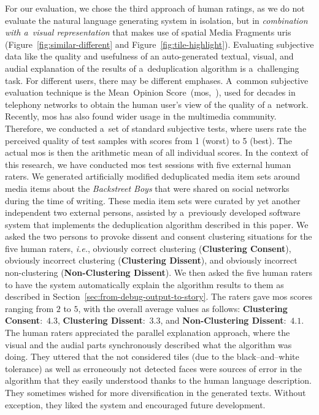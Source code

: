 \documentclass{article}
\begin{document}
For our evaluation, we chose the third approach of human ratings, as we do not evaluate the natural language generating system in isolation, but in \emph{combination with a~visual representation} that makes use of spatial Media Fragments {\sc uri}s (Figure~\ref{fig:similar-different} and Figure~\ref{fig:tile-highlight}). Evaluating subjective data like the quality and usefulness of an auto-generated textual, visual, and audial explanation of the results of a~deduplication algorithm is a~challenging task. For different users, there may be different emphases. A~common subjective evaluation technique
is the Mean~Opinion Score~({\sc mos},~\cite{itu1998mos}), used for decades in telephony networks to obtain the human user's view of the quality of a~network.
Recently, {\sc mos} has also found wider usage in the multimedia community. Therefore, we conducted a~set of standard subjective tests, where users rate the perceived quality of test samples with scores from 1 (worst) to 5 (best). The actual {\sc mos} is then the arithmetic mean of all individual scores. In the context of this research, we have conducted {\sc mos} test sessions with five external human raters. We generated artificially modified deduplicated media item sets around media items about the \emph{Backstreet Boys} that were shared on social networks during the time of writing. These media item sets were curated by yet another independent two external persons, assisted by a~previously developed software system that implements the deduplication algorithm described in this paper. We asked the two persons to provoke dissent and consent clustering situations for the five human raters, \emph{i.e.}, obviously correct clustering (\textbf{Clustering Consent}), obviously incorrect clustering (\textbf{Clustering Dissent}), and obviously incorrect non-clustering (\textbf{Non-Clustering Dissent}). We then asked the five human raters to have the system automatically explain the algorithm results to them as described in Section~\ref{sec:from-debug-output-to-story}. The raters gave {\sc mos} scores ranging from $2$ to $5$, with the overall average values as follows: \textbf{Clustering Consent}:~$4.3$, \textbf{Clustering Dissent}:~$3.3$, and \textbf{Non-Clustering Dissent}:~$4.1$. The human raters appreciated the parallel explanation approach, where the visual and the audial parts synchronously described what the algorithm was doing. They uttered that the not considered tiles (due to the black--and--white tolerance) as well as erroneously not detected faces were sources of error in the algorithm that they easily understood thanks to the human language description. They sometimes wished for more diversification in the generated texts. Without exception, they liked the system and encouraged future development.
\end{document}
